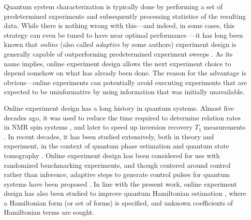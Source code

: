 \documentclass[aps,nofootinbib,twocolumn,superscriptaddress]{revtex4}
\begin{document}
Quantum system characterization is typically done by performing 
a set of predetermined experiments and subsequently processing 
statistics of the resulting data.
While there is nothing wrong with this---and indeed, in some cases,
this strategy can even be tuned to have near optimal performance
\cite{chaloner_bayesian_1995,higgins_demonstrating_2009}---it
has long been known that \textit{online} 
(also called \textit{adaptive} by some authors)
experiment design is generally 
capable of outperforming predetermined experiment sweeps
\cite{chaloner_bayesian_1995}.
As its name implies, online experiment design allows the next experiment 
choice to depend somehow on what has already been done.
The reason for the advantage is obvious---online 
experiments can potentially avoid executing experiments that 
are expected to be uninformative by using information that was 
initially unavailable.

Online experiment design has a long history in quantum systems.
Almost five decades ago, it was used to reduce the time required to 
determine relation rates in NMR spin systems \cite{freeman_adaptive_1972}, 
and later to speed up inversion recovery $T_1$ measurements
\cite{taitelbaum_two-stage_1993}.
In recent decades, it has been studied extensively, both in theory
and experiment, in the context of quantum phase estimation
\cite{
    wiseman_adaptive_1995,
    berry_optimal_2001,
    higgins_entanglement-free_2007,
    berry_how_2009,
    higgins_demonstrating_2009,
    xiang_entanglement-enhanced_2011,
    yonezawa_quantum-enhanced_2012,
    ciampini_quantum-enhanced_2016}
and quantum state tomography
\cite{
    huszar_adaptive_2012,
    kravtsov_experimental_2013,
    ferrie_self-guided_2014,
    stenberg_adaptive_2015,
    struchalin_experimental_2016,
    granade_practical_2016,
    qi_adaptive_2017}.
Online experiment design has been considered for use
with randomized benchmarking experiments\cite{granade_accelerated_2015},
and though centered around control rather than inference, adaptive steps
to generate control pulses for quantum systems have been proposed
\cite{egger_adaptive_2014,ferrie_robust_2015,rol_restless_2017}.
In line with the present work, online experiment design has also been 
studied to improve quantum Hamiltonian estimation
\cite{
    sergeevich_characterization_2011,
    granade_robust_2012,
    ferrie_how_2013,
    wiebe_hamiltonian_2014,
    stenberg_simultaneous_2016,
    stenberg_characterization_2016}, 
where a Hamiltonian form (or set of forms) is specified, and 
unknown coefficients of Hamiltonian terms are sought.
\end{document}
